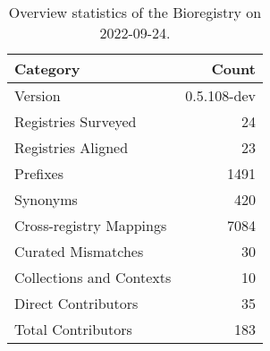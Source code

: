 \begin{table}
\centering
\caption{Overview statistics of the Bioregistry on 2022-09-24.}
\label{tab:bioregistry-summary}
\begin{tabular}{lr}
\toprule
                Category &       Count \\
\midrule
                 Version & 0.5.108-dev \\
     Registries Surveyed &          24 \\
      Registries Aligned &          23 \\
                Prefixes &        1491 \\
                Synonyms &         420 \\
 Cross-registry Mappings &        7084 \\
      Curated Mismatches &          30 \\
Collections and Contexts &          10 \\
     Direct Contributors &          35 \\
      Total Contributors &         183 \\
\bottomrule
\end{tabular}
\end{table}
